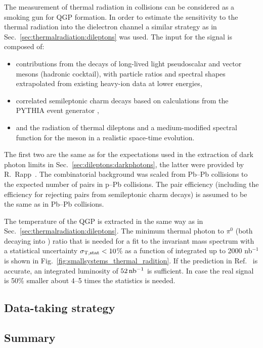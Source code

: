 \documentclass[../report.tex]{subfiles}
\begin{document}
The measurement of thermal radiation in \pPb{} collisions can be considered as a smoking gun for QGP formation. In order to estimate the sensitivity to the thermal radiation into the dielectron channel a similar strategy as in Sec.~\ref{sec:thermalradiation:dileptons} was used. 
The input for the signal is composed of:
\begin{itemize}
\item contributions from the decays of long-lived light pseudoscalar and vector mesons (hadronic cocktail), with particle ratios and spectral shapes extrapolated from existing heavy-ion data at lower energies,
\item correlated semileptonic charm decays based on calculations from the PYTHIA event generator \cite{Sjostrand:2006za}, 
\item and the radiation of thermal dileptons and a medium-modified spectral function for the \Prho meson in a realistic space-time evolution.
\end{itemize}
The first two are the same as for the expectations used in the extraction of dark photon limits in Sec.~\ref{sec:dileptons:darkphotons}, the latter were provided by R.~Rapp~\cite{RappPriv1}. The combinatorial background was scaled from Pb--Pb collisions to the expected number of pairs in p--Pb collisions. The pair efficiency (including the efficiency for rejecting \Pepem pairs from semileptonic charm decays) is assumed to be the same as in Pb--Pb collisions. 

The temperature of the QGP is extracted in the same way as in Sec.~\ref{sec:thermalradiation:dileptons}. The minimum thermal photon to $\pi^{0}$ (both decaying into \Pepem) ratio that is needed for a fit to the invariant mass spectrum with a statistical uncertainty $\sigma_{\rm T,stat} < 10$\% as a function of integrated up to 2000 nb$^{-1}$ is shown in Fig.~\ref{fig:smallsystems_thermal_radition}. If the prediction in Ref.~\cite{RappPriv1} is accurate, an integrated luminosity of $\unit[52]{nb^{-1}}$ is sufficient. In case the real signal is 50\% smaller about 4--5 times the statistics is needed.

\subsection{Data-taking strategy}


\subsection{Summary}
\end{document}

